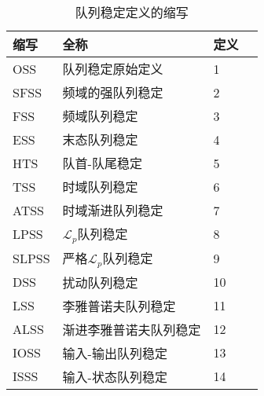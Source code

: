 \begin{translation}
\begin{table}
  \centering
  \caption{队列稳定定义的缩写}
  \begin{tabular}{llll}
    \toprule
    缩写       &  全称                &   定义       \\
    \midrule
    OSS       &  队列稳定原始定义              &  1           \\
    SFSS      &  频域的强队列稳定              &  2           \\
    FSS       &  频域队列稳定                 &  3           \\
    ESS       &  末态队列稳定                 &  4           \\
    HTS       &  队首-队尾稳定                &  5           \\
    TSS       &  时域队列稳定                 &  6           \\
    ATSS      &  时域渐进队列稳定              &  7           \\
    LPSS      &  $\mathcal{L}_p$队列稳定     &  8           \\
    SLPSS     &  严格$\mathcal{L}_p$队列稳定  &  9           \\
    DSS       &  扰动队列稳定                 &  10          \\
    LSS       &  李雅普诺夫队列稳定            &  11          \\
    ALSS      &  渐进李雅普诺夫队列稳定        &  12          \\
    IOSS      &  输入-输出队列稳定            &  13          \\
    ISSS      &  输入-状态队列稳定            &  14          \\
    \bottomrule
  \end{tabular}
  \label{tab:appendix-translation-tableA2}
\end{table}

\begin{translation-index}
  \nocite{FENG201981}
  
  
\end{translation-index}

\end{translation}

